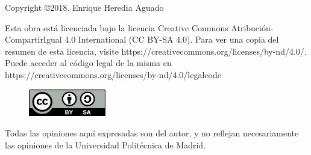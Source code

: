 \begin{flushleft}

Copyright \copyright  2018. Enrique Heredia Aguado


Esta obra está licenciada bajo la licencia Creative Commons Atribución-CompartirIgual 4.0 International (CC BY-SA 4.0). Para ver una copia del resumen de esta licencia, visite https://creativecommons.org/licenses/by-nd/4.0/. Puede acceder al código legal de la misma en https://creativecommons.org/licenses/by-nd/4.0/legalcode
\\

\begin{figure}[H]
	\centering
	\includegraphics[width=0.3\textwidth]{figuras/ccbysa.png}
\end{figure}



Todas las opiniones aquí expresadas son del autor, y no reflejan necesariamente las opiniones
de la Universidad Politécnica de Madrid.

\end{flushleft}
